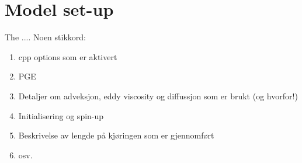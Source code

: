 \section{Model set-up}
\label{sec:setup}
The ....
Noen stikkord:
\begin{enumerate}
 \item cpp options som er aktivert
 \item PGE
 \item Detaljer om adveksjon, eddy viscosity og diffussjon som er brukt (og hvorfor!)
 \item Initialisering og spin-up
 \item Beskrivelse av lengde på kjøringen som er gjennomført   
 \item osv.   
\end{enumerate}